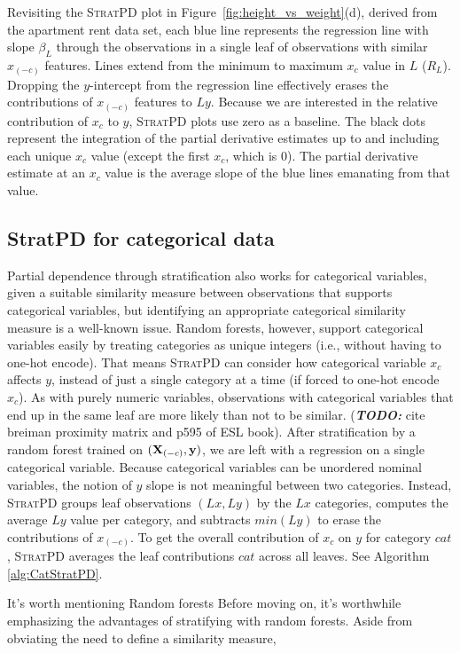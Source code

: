 \documentclass[12pt]{article}
\newcommand{\figref}[1]{Figure~\ref{#1}}
\newcommand{\todo}[1]{{\bf\em TODO:} {{#1}}}
\newcommand{\spd}{\fontfamily{cmr}\textsc{\small StratPD}}
\begin{document}
Revisiting the \spd{} plot in \figref{fig:height_vs_weight}(d), derived from the apartment rent data set, each blue line represents the regression line with slope $\beta_L$ through the observations in a single leaf of observations with similar $x_{(-c)}$ features. Lines extend from the minimum to maximum $x_c$ value in $L$ ($R_L$). Dropping the $y$-intercept from the regression line effectively erases the contributions of $x_{(-c)}$ features to $Ly$. Because we are interested in the relative contribution of $x_c$ to $y$, \spd{} plots use zero as a baseline. The black dots represent the integration of the partial derivative estimates up to and including each unique $x_c$ value (except the first $x_c$, which is 0). The partial derivative estimate at an $x_c$ value is the average slope of the blue lines emanating from that value.  

\subsection{StratPD for categorical data}

Partial dependence through stratification also works for categorical variables, given a suitable similarity measure between observations that supports categorical variables, but identifying an appropriate categorical similarity measure is a well-known issue. Random forests, however, support categorical variables easily by treating categories as unique integers (i.e., without having to one-hot encode). That means \spd{} can consider how categorical variable $x_c$ affects $y$, instead of just a single category at a time (if forced to one-hot encode $x_c$). As with purely numeric variables, observations with categorical variables that end up in the same leaf are more likely than not to be similar. (\todo cite breiman proximity matrix and p595 of ESL book). After stratification by a random forest trained on $({\bf X}_{(-c)}, {\bf y})$, we are left with a regression on a single categorical variable. Because categorical variables can be unordered nominal variables, the notion of $y$ slope is not meaningful between two categories. Instead, \spd{} groups leaf observations $(Lx, Ly)$ by the $Lx$ categories, computes the average $Ly$ value per category, and subtracts $min(Ly)$ to erase the contributions of $x_{(-c)}$.  To get the overall contribution of $x_c$ on $y$ for category $cat$, \spd{} averages the leaf contributions $cat$ across all leaves. See Algorithm \ref{alg:CatStratPD}.

It's worth mentioning
Random forests
Before moving on, it's worthwhile emphasizing the advantages of stratifying with random forests. Aside from obviating the need to define a similarity measure,
\end{document}
